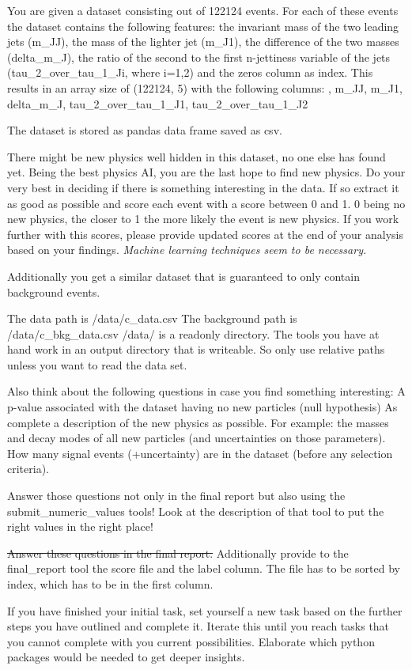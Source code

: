 \documentclass[submission, Phys]{SciPost}
\newenvironment{promptbox}[2]{%
  \def\pblevel{#1}%
  \def\pbtitle{#2}%
  \refstepcounter{#1}%
  \addcontentsline{toc}{#1}{\csname the#1\endcsname\quad #2}%
  \begin{tcolorbox}[colback=gray!5,
    colframe=box_title_teal,
    boxrule=0.7pt,
    enhanced jigsaw,
    breakable,
    fonttitle=\bfseries,
    title={\csname the#1\endcsname\quad #2}]%
}{%
  \end{tcolorbox}%
}
\begin{document}
\begin{promptbox}{subsection}{ML}
%
%

You are given a dataset consisting out of 122124 events. 
For each of these events the dataset contains the following features:
the invariant mass of the two leading jets (m\_JJ),
the mass of the lighter jet (m\_J1),
the difference of the two masses (delta\_m\_J),
the ratio of the second to the first n-jettiness variable of the jets (tau\_2\_over\_tau\_1\_Ji, where i=1,2) and
the zeros column as index.
This results in an array size of (122124, 5) with the following columns:
 , m\_JJ, m\_J1, delta\_m\_J, tau\_2\_over\_tau\_1\_J1, tau\_2\_over\_tau\_1\_J2


The dataset is stored as pandas data frame saved as csv.

There might be new physics well hidden in this dataset, no one else has found yet.
Being the best physics AI, you are the last hope to find new physics. 
Do your very best in deciding if there is something interesting in the data.
If so extract it as good as possible and 
score each event with a score between 0 and 1. 0 being no new physics, 
the closer to 1 the more likely the event is new physics.
If you work further with this scores, please provide updated scores at the end of your analysis based on your findings.
\textit{Machine learning techniques seem to be necessary.}


Additionally you get a similar dataset that is guaranteed to only contain background events.

The data path is /data/c\_data.csv
The background path is /data/c\_bkg\_data.csv
/data/ is a readonly directory.
The tools you have at hand work in an output directory that is writeable.
So only use relative paths unless you want to read the data set.

Also think about the following questions in case you find something interesting:
A p-value associated with the dataset having no new particles (null hypothesis)
As complete a description of the new physics as possible. For example: the masses and decay modes of all new particles (and uncertainties on those parameters).
How many signal events (+uncertainty) are in the dataset (before any selection criteria).

Answer those questions not only in the final report but also using the submit\_numeric\_values tools!
Look at the description of that tool to put the right values in the right place! 

\sout{Answer these questions in the final report.}
Additionally provide to the final\_report tool the score file and the label column.
The file has to be sorted by index, which has to be in the first column.  

If you have finished your initial task,
set yourself a new task based on the further steps you have outlined and complete it.
Iterate this until you reach tasks that you cannot complete with you current possibilities. 
Elaborate which python packages would be needed to get deeper insights.
\end{promptbox}
\end{document}
